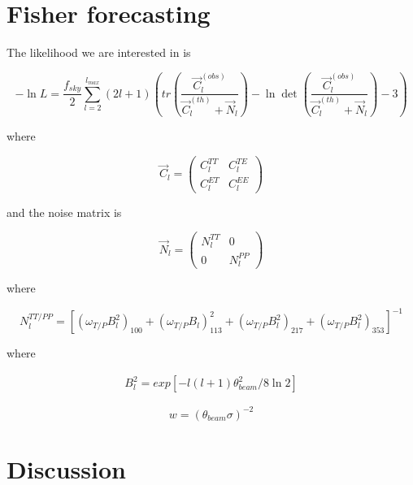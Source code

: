 \documentclass[aps,showpacs,twocolumn,floats,prd,superscriptaddress,nofootinbib]{revtex4-1}
\begin{document}
\section{Fisher forecasting}

The likelihood we are interested in is

\begin{equation}
	-\ln L = \frac{f_{sky}}{2} \sum_{l = 2}^{l_{max}} (2l + 1) \left( tr \left( \frac{\vec{C}_l^{(obs)}}{\vec{C}^{(th)}_l + \vec{N}_l} \right) - \ln \det \left( \frac{\vec{C}_l^{(obs)}}{\vec{C}_l^{(th)} + \vec{N}_l} \right) - 3 \right)
\end{equation}

where 

\begin{equation}
	\vec{C}_l = \begin{pmatrix} C_l^{TT} & C_l^{TE} \\ C_l^{ET} & C_l^{EE} \end{pmatrix}
\end{equation}

and the noise matrix is

\begin{equation}
	\vec{N}_l = \begin{pmatrix} N^{TT}_l & 0 \\ 0 & N^{PP}_l \end{pmatrix}
\end{equation}

where

\begin{equation}
	N^{TT/PP}_l = [(\omega_{T/P} B_l^2)_{100} + (\omega_{T/P} B_l)^2_{113} + (\omega_{T/P} B_l^2)_{217} + (\omega_{T/P} B_l^2)_{353}]^{-1}
\end{equation}

where 

\begin{eqnarray}
	B_l^2 = exp[-l(l+1)\theta_{beam}^2 / 8 \ln 2]
\end{eqnarray}

\begin{equation}
	w = (\theta_{beam} \sigma)^{-2}
\end{equation}

\section{Discussion}
 
 

\end{document}
